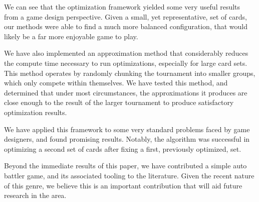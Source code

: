 We can see that the optimization framework yielded some very useful results from a game design perspective. Given a small, yet representative, set of cards, our methods were able to find a much more balanced configuration, that would likely be a far more enjoyable game to play.

We have also implemented an approximation method that considerably reduces the compute time necessary to run optimizations, especially for large card sets. This method operates by randomly chunking the tournament into smaller groups, which only compete within themselves. We have tested this method, and determined that under most circumstances, the approximations it produces are close enough to the result of the larger tournament to produce satisfactory optimization results. 

We have applied this framework to some very standard problems faced by game designers, and found promising results. Notably, the algorithm was successful in optimizing a second set of cards after fixing a first, previously optimized, set. 

Beyond the immediate results of this paper, we have contributed a simple auto battler game, and its associated tooling to the literature. Given the recent nature of this genre, we believe this is an important contribution that will aid future research in the area. 